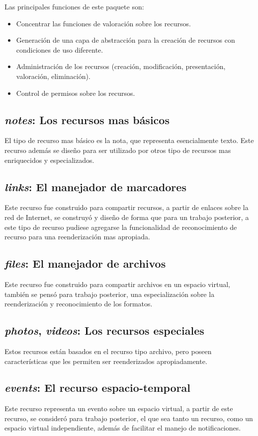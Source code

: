 Las principales funciones de este paquete son:

\begin{itemize}
\item Concentrar las funciones de valoración sobre los recursos.
\item Generación de una capa de abstracción para la creación de recursos con
condiciones de uso diferente.
\item Administración de los recursos (creación, modificación, presentación,
valoración, eliminación).
\item Control de permisos sobre los recursos.
\end{itemize}

\subsection{\emph{notes}: Los recursos mas básicos}
El tipo de recurso mas básico es la nota, que representa esencialmente texto.
Este recurso además se diseño para ser utilizado por otros tipo de recursos mas
enriquecidos y especializados.

\subsection{\emph{links}: El manejador de marcadores}
Este recurso fue construido para compartir recursos, a partir de enlaces sobre
la red de Internet, se construyó y diseño de forma que para un trabajo
posterior, a este tipo de recurso pudiese agregarse la funcionalidad de
reconocimiento de recurso para una reenderización mas apropiada.

\subsection{\emph{files}: El manejador de archivos}
Este recurso fue construido para compartir archivos en un espacio virtual,
también se pensó para trabajo posterior, una especialización sobre la
reenderización y reconocimiento de los formatos.

\subsection{\emph{photos}, \emph{videos}: Los recursos especiales}
Estos recursos están basados en el recurso tipo archivo, pero poseen
características que les permiten ser reenderizados apropiadamente.

\subsection{\emph{events}: El recurso espacio-temporal}
Este recurso representa un evento sobre un espacio virtual, a partir de este
recurso, se consideró para trabajo posterior, el que sea tanto un recurso, como
un espacio virtual independiente, además de facilitar el manejo de
notificaciones.

